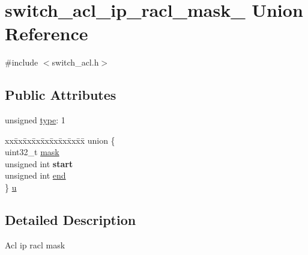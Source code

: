 \hypertarget{unionswitch__acl__ip__racl__mask__}{\section{switch\+\_\+acl\+\_\+ip\+\_\+racl\+\_\+mask\+\_\+ Union Reference}
\label{unionswitch__acl__ip__racl__mask__}
}


{\ttfamily \#include $<$switch\+\_\+acl.\+h$>$}

\subsection*{Public Attributes}
\begin{DoxyCompactItemize}
\item 
unsigned \hyperlink{unionswitch__acl__ip__racl__mask___a9fb44c579543e9773d79d3728aa6f471}{type}\+: 1
\item 
\begin{tabbing}
xx\=xx\=xx\=xx\=xx\=xx\=xx\=xx\=xx\=\kill
union \{\\
\>uint32\_t \hyperlink{unionswitch__acl__ip__racl__mask___ac9c6050f09ecc54c87664cde6781cac4}{mask}\\
\>unsigned int {\bfseries start}\\
\>unsigned int \hyperlink{unionswitch__acl__ip__racl__mask___a847be677f77095a8175ecf3c33a97f88}{end}\\
\} \hyperlink{unionswitch__acl__ip__racl__mask___a3e08e0c1f3b97c0c217789f3fa021c5f}{u}\\

\end{tabbing}\end{DoxyCompactItemize}


\subsection{Detailed Description}
Acl ip racl mask 

